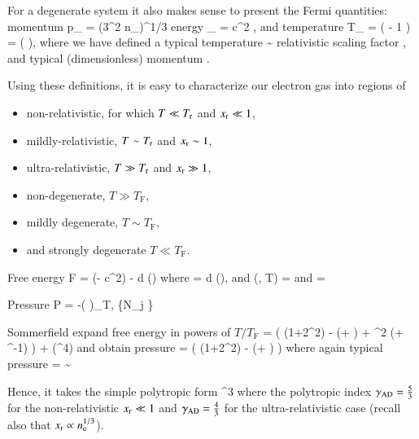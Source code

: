For a degenerate system it also makes sense to present the Fermi quantities:
momentum
\be
p_{} = \hbar (3\pi^2 n_{})^{1/3}
\ee
energy
\be
\epsilon_{} = c^2 ,
\ee
and temperature
\be
T_{} =  \left(  - 1 \right)
= \Tr (  ),
\ee
where we have defined a typical temperature
\be
\Tr \equiv {} \sim {} \Kelvin
\ee
relativistic scaling factor
\be
\gammar \equiv {},
\ee
and typical (dimensionless) momentum
\be
\xr \equiv {}.
\ee

Using these definitions, it is easy to characterize our electron gas into regions of 
\begin{itemize}
    \item non-relativistic, for which $T \ll T_{\mathrm{r}}$ and $x_{\mathrm{r}} \ll 1$, 
    \item mildly-relativistic, $T \sim T_{\mathrm{r}}$ and $x_{\mathrm{r}} \sim 1$,
    \item ultra-relativistic, $T \gg T_{\mathrm{r}}$ and $x_{\mathrm{r}} \gg 1$,
    \item non-degenerate, $T \gg T_{\mathrm{F}}$,
    \item mildly degenerate, $T \sim T_{\mathrm{F}}$,
    \item and strongly degenerate $T \ll T_{\mathrm{F}}$.
\end{itemize}

Free energy
\be
F = (\mu  - \me c^2) \nel -  \int d   \cdot {} \fFD(\epsilon)
\ee
where 
\be
\nel =  \int d \fFD(\epsilon),
\ee
and
\be
\fFD(\epsilon, T) = 
\ee
and
\be
\epsilon = 
\ee

Pressure 
\be
P = -\left(  \right)_{T, \{N_j \} }
\ee

Sommerfield expand free energy in powers of $T/T_{\mathrm{F}}$ 
\be
{} =    \left( \xr(1+2\xr^2) \gammar - \ln(\xr + \gammar) +  \tr^2 \xr(\gammar + \gammar^{-1})  \right)  + (\tr^4)
\ee
and obtain pressure 
\be
\Peid =  \left( \xr(1+2\xr^2) \gammar - \ln(\xr + \gammar) \right)
\ee
where again typical pressure
\be
\Pressr =  \sim {} \dyncm
\ee

Hence, it takes the simple polytropic form
\be
\Peid \approx \frac{ \Pressr }{9\pi^2 \gammaad} \xr^{3\gammaad}
\ee
where the polytropic index $\gamma_{\mathrm{AD}} = \frac{5}{3}$ for the non-relativistic $x_{\mathrm{r}} \ll 1$ and $\gamma_{\mathrm{AD}} = \frac{4}{3}$ for the ultra-relativistic case (recall also that $x_{\mathrm{r}} \propto n_{\mathrm{e}}^{1/3}$).


